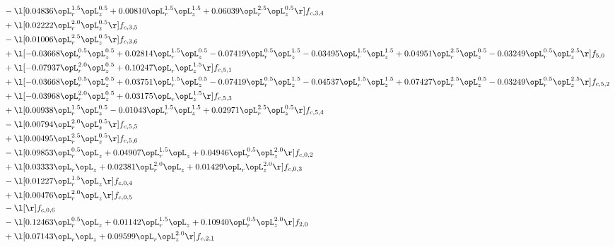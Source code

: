 \begin{alignat}{2}
& - \l[  0.04836 \opL_r^{1.5} \opL_z^{0.5} +  0.00810 \opL_r^{1.5} \opL_z^{1.5} +  0.06039 \opL_r^{2.5} \opL_z^{0.5}  \r] f_{c,3,4} \nonumber \\ 
& + \l[  0.02222 \opL_r^{2.0} \opL_z^{0.5}  \r] f_{c,3,5} \nonumber \\ 
& - \l[  0.01006 \opL_r^{2.5} \opL_z^{0.5}  \r] f_{c,3,6} \nonumber \\ 
& + \l[  -0.03668 \opL_r^{0.5} \opL_z^{0.5} +  0.02814 \opL_r^{1.5} \opL_z^{0.5}   -0.07419 \opL_r^{0.5} \opL_z^{1.5}   -0.03495 \opL_r^{1.5} \opL_z^{1.5} +  0.04951 \opL_r^{2.5} \opL_z^{0.5}   -0.03249 \opL_r^{0.5} \opL_z^{2.5}  \r] f_{5,0} \nonumber \\ 
& + \l[  -0.07937 \opL_r^{2.0} \opL_z^{0.5} +  0.10247 \opL_r \opL_z^{1.5}  \r] f_{c,5,1} \nonumber \\ 
& + \l[  -0.03668 \opL_r^{0.5} \opL_z^{0.5} +  0.03751 \opL_r^{1.5} \opL_z^{0.5}   -0.07419 \opL_r^{0.5} \opL_z^{1.5}   -0.04537 \opL_r^{1.5} \opL_z^{1.5} +  0.07427 \opL_r^{2.5} \opL_z^{0.5}   -0.03249 \opL_r^{0.5} \opL_z^{2.5}  \r] f_{c,5,2} \nonumber \\ 
& + \l[  -0.03968 \opL_r^{2.0} \opL_z^{0.5} +  0.03175 \opL_r \opL_z^{1.5}  \r] f_{c,5,3} \nonumber \\ 
& + \l[  0.00938 \opL_r^{1.5} \opL_z^{0.5}   -0.01043 \opL_r^{1.5} \opL_z^{1.5} +  0.02971 \opL_r^{2.5} \opL_z^{0.5}  \r] f_{c,5,4} \nonumber \\ 
& - \l[  0.00794 \opL_r^{2.0} \opL_z^{0.5}  \r] f_{c,5,5} \nonumber \\ 
& + \l[  0.00495 \opL_r^{2.5} \opL_z^{0.5}  \r] f_{c,5,6} \nonumber \\ 
& - \l[  0.09853 \opL_r^{0.5} \opL_z +  0.04907 \opL_r^{1.5} \opL_z +  0.04946 \opL_r^{0.5} \opL_z^{2.0}  \r] f_{c,0,2} \nonumber \\ 
& + \l[  0.03333 \opL_r \opL_z +  0.02381 \opL_r^{2.0} \opL_z +  0.01429 \opL_r \opL_z^{2.0}  \r] f_{c,0,3} \nonumber \\ 
& - \l[  0.01227 \opL_r^{1.5} \opL_z  \r] f_{c,0,4} \nonumber \\ 
& + \l[  0.00476 \opL_r^{2.0} \opL_z  \r] f_{c,0,5} \nonumber \\ 
& - \l[  \r] f_{c,0,6} \nonumber \\ 
& - \l[  0.12463 \opL_r^{0.5} \opL_z +  0.01142 \opL_r^{1.5} \opL_z +  0.10940 \opL_r^{0.5} \opL_z^{2.0}  \r] f_{2,0} \nonumber \\ 
& + \l[  0.07143 \opL_r \opL_z +  0.09599 \opL_r \opL_z^{2.0}  \r] f_{c,2,1} \nonumber \\ 

\end{alignat}
